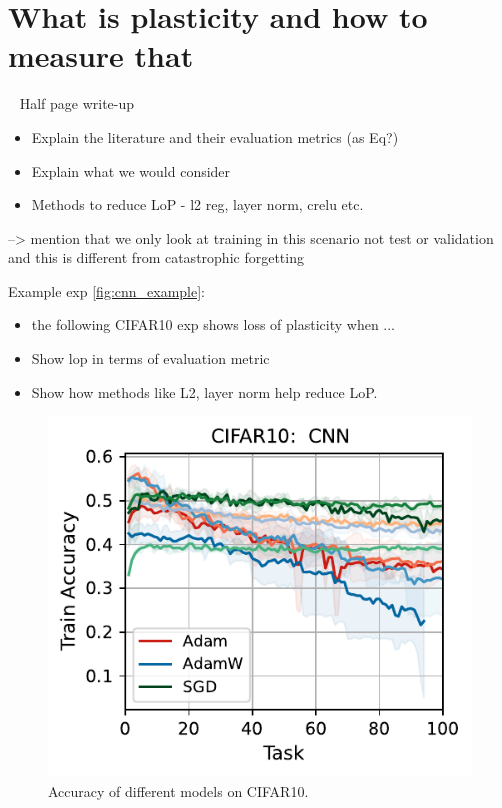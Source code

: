 \section{What is plasticity and how to measure that}

~ Half page write-up
\begin{itemize}
    \item Explain the literature and their evaluation metrics (as Eq?)
    \item Explain what we would consider
    \item Methods to reduce LoP - l2 reg, layer norm, crelu etc.
\end{itemize}


--> mention that we only look at training in this scenario not test or validation and this is different from catastrophic forgetting 

Example exp \autoref{fig:cnn_example}:
\begin{itemize}
    \item the following CIFAR10 exp shows loss of plasticity when ...
    \item Show lop in terms of evaluation metric
    \item Show how methods like L2, layer norm help reduce LoP.
\end{itemize}
\begin{figure}[t]
    \centering
    \includegraphics[width=\linewidth]{figs/Accuracy/image/cnn/cifar10_50.pdf}
    \caption{Accuracy of different models on CIFAR10.}
    \label{fig:cnn_example}
\end{figure}
